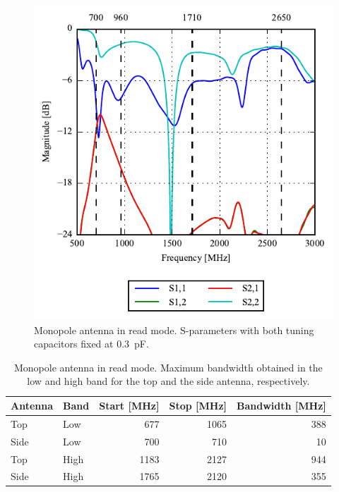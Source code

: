\begin{figure}[htbp]
    \centering
    \includegraphics{img/tech_sol/monopole/read_mode/sparam_read.pdf}
    \caption{Monopole antenna in read mode. S-parameters with both tuning capacitors fixed at \SI{0.3}{pF}.}
    \label{fig:triang_sparam_read}
\end{figure}

\begin{table}[htbp]
  \centering
  \begin{tabular}{|l|l|r|r|r|}
    \hline
    Antenna & Band & Start [MHz] & Stop [MHz] & Bandwidth [MHz] \\
    \hline
    Top     & Low  &  677  & 1065  & 388 \\
    Side    & Low  &  700  & 710  & 10  \\
    \hline
    Top     & High &  1183 &  2127  & 944 \\
    Side    & High & 1765 &  2120 & 355 \\
    \hline
  \end{tabular}
  \caption{Monopole antenna in read mode. Maximum bandwidth obtained in the low and high band for the top and the side antenna, respectively.}    


  \label{tab:bw_sol1read}
\end{table}

